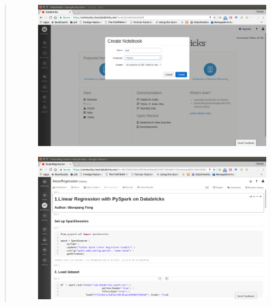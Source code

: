 \documentclass[letterpaper,11pt,english]{sphinxmanual}
\begin{document}
\begin{quote}
\begin{figure}[htbp]
\centering

\includegraphics{notebook.png}
\label{setup:fig-notebook}\end{figure}
\begin{figure}[htbp]
\centering

\includegraphics{codenotebook.png}
\label{setup:fig-codenotebook}\end{figure}
\end{quote}
\end{document}
